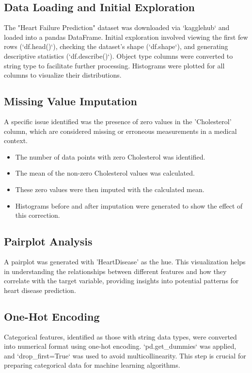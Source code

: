 \documentclass{article}
\begin{document}
\subsection{Data Loading and Initial Exploration}
The "Heart Failure Prediction" dataset was downloaded via `kagglehub` and loaded into a pandas DataFrame. Initial exploration involved viewing the first few rows (`df.head()`), checking the dataset's shape (`df.shape`), and generating descriptive statistics (`df.describe()`). Object type columns were converted to string type to facilitate further processing. Histograms were plotted for all columns to visualize their distributions.

\subsection{Missing Value Imputation}
A specific issue identified was the presence of zero values in the 'Cholesterol' column, which are considered missing or erroneous measurements in a medical context.
\begin{itemize}
    \item The number of data points with zero Cholesterol was identified.
    \item The mean of the non-zero Cholesterol values was calculated.
    \item These zero values were then imputed with the calculated mean.
    \item Histograms before and after imputation were generated to show the effect of this correction.
\end{itemize}

\subsection{Pairplot Analysis}
A pairplot was generated with 'HeartDisease' as the hue. This visualization helps in understanding the relationships between different features and how they correlate with the target variable, providing insights into potential patterns for heart disease prediction.

\subsection{One-Hot Encoding}
Categorical features, identified as those with string data types, were converted into numerical format using one-hot encoding. `pd.get_dummies` was applied, and `drop_first=True` was used to avoid multicollinearity. This step is crucial for preparing categorical data for machine learning algorithms.
\end{document}
